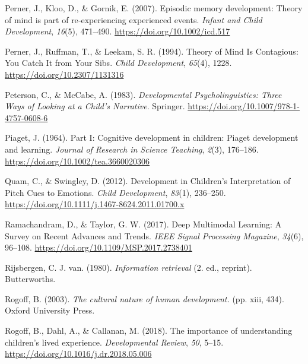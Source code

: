 \documentclass[
  english,
  12pt,
  man,floatsintext]{apa6}
\newlength{\cslhangindent}
\newenvironment{CSLReferences}[2] %
 {\begin{list}{}{%
  \setlength{\itemindent}{0pt}
  \setlength{\leftmargin}{0pt}
  \setlength{\parsep}{0pt}
  \ifodd #1
   \setlength{\leftmargin}{\cslhangindent}
   \setlength{\itemindent}{-1\cslhangindent}
  \fi
  \setlength{\itemsep}{#2\baselineskip}}}
 {\end{list}}
\begin{document}
\begin{CSLReferences}{1}{0}
Perner, J., Kloo, D., \& Gornik, E. (2007). Episodic memory development: Theory of mind is part of re‐experiencing experienced events. \emph{Infant and Child Development}, \emph{16}(5), 471--490. \url{https://doi.org/10.1002/icd.517}

Perner, J., Ruffman, T., \& Leekam, S. R. (1994). Theory of {Mind Is Contagious}: {You Catch It} from {Your Sibs}. \emph{Child Development}, \emph{65}(4), 1228. \url{https://doi.org/10.2307/1131316}

Peterson, C., \& McCabe, A. (1983). \emph{Developmental {Psycholinguistics}: {Three Ways} of {Looking} at a {Child}'s {Narrative}}. Springer. \url{https://doi.org/10.1007/978-1-4757-0608-6}

Piaget, J. (1964). Part {I}: {Cognitive} development in children: {Piaget} development and learning. \emph{Journal of Research in Science Teaching}, \emph{2}(3), 176--186. \url{https://doi.org/10.1002/tea.3660020306}

Quam, C., \& Swingley, D. (2012). Development in {Children}'s {Interpretation} of {Pitch Cues} to {Emotions}. \emph{Child Development}, \emph{83}(1), 236--250. \url{https://doi.org/10.1111/j.1467-8624.2011.01700.x}

Ramachandram, D., \& Taylor, G. W. (2017). Deep {Multimodal Learning}: {A Survey} on {Recent Advances} and {Trends}. \emph{IEEE Signal Processing Magazine}, \emph{34}(6), 96--108. \url{https://doi.org/10.1109/MSP.2017.2738401}

Rijsbergen, C. J. van. (1980). \emph{Information retrieval} (2. ed., reprint). Butterworths.

Rogoff, B. (2003). \emph{The cultural nature of human development.} (pp. xiii, 434). Oxford University Press.

Rogoff, B., Dahl, A., \& Callanan, M. (2018). The importance of understanding children's lived experience. \emph{Developmental Review}, \emph{50}, 5--15. \url{https://doi.org/10.1016/j.dr.2018.05.006}


\end{CSLReferences}
\end{document}
